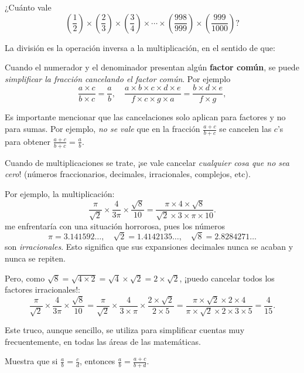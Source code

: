 \begin{ejercicio}
¿Cuánto vale $$\left(\frac{1}{2}\right)\times\left(\frac{2}{3}\right)\times\left(\frac{3}{4}\right)\times\cdots \times\left(\frac{998}{999}\right)\times\left( \frac{999}{1000}\right)?$$
\end{ejercicio}


La división es la operación inversa a la multiplicación, en el sentido de que:

Cuando el numerador y el denominador presentan algún {\bf factor común}, se puede \emph{simplificar la fracción cancelando el factor común}. Por ejemplo $$\frac{a\times c}{b\times c}=\frac{a}{b}, \quad \frac{a\times b\times c\times d \times e}{f \times c\times g \times a }=\frac{b\times d\times e}{f\times g},$$


Es importante mencionar que las cancelaciones solo aplican para factores y no para sumas. Por ejemplo, \emph{no se vale} que en la fracción $\frac{a+c}{b+c}$ se cancelen las $c$'s para obtener $\frac{a+c}{b+c}=\frac{a}{b}$.

Cuando de multiplicaciones se trate, ¡se vale cancelar \emph{cualquier cosa que no sea cero}! (números fraccionarios, decimales, irracionales, complejos, etc).

Por ejemplo, la multiplicación:
$$\frac{\pi}{\sqrt{2}}\times \frac{4}{3 \pi}\times \frac{\sqrt{8}}{10}=\frac{\pi \times 4\times \sqrt{8}}{\sqrt{2} \times 3 \times \pi \times 10}.$$ 
me enfrentaría con una situación horrorosa, pues los números $$\pi=3.141592\dots,\quad  \sqrt{2}=1.4142135\dots, \quad \sqrt{8}=2.8284271\dots$$ son \emph{irracionales}. Esto significa que sus expansiones decimales nunca se acaban y nunca se repiten.

Pero, como $\sqrt{8}=\sqrt{4\times 2}=\sqrt{4}\times \sqrt{2}=2\times \sqrt{2}$, ¡puedo cancelar todos los factores irracionales!:
$$\frac{\pi}{\sqrt{2}}\times \frac{4}{3 \pi}\times \frac{\sqrt{8}}{10}=\frac{\pi}{\sqrt{2}}\times \frac{4}{3 \times \pi}\times \frac{2\times \sqrt{2}}{2\times 5}=\frac{\pi \times \sqrt{2}\times 2 \times 4}{\pi \times \sqrt{2}\times 2\times 3\times 5}=\frac{4}{15}.$$

Este truco, aunque sencillo, se utiliza para simplificar cuentas muy frecuentemente, en todas las áreas de las matemáticas.


\begin{ejercicio}
Muestra que si $\frac{a}{b}=\frac{c}{d}$, entonces $\frac{a}{b}=\frac{a+c}{b+d}$.
\end{ejercicio}

